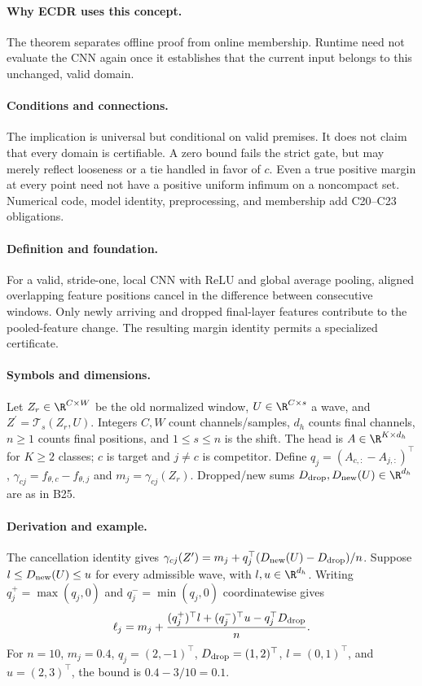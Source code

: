 \paragraph{Why ECDR uses this concept.}
The theorem separates offline proof from online membership. Runtime need not evaluate the CNN again once it establishes that the current input belongs to this unchanged, valid domain.
\paragraph{Conditions and connections.}
The implication is universal but conditional on valid premises. It does not claim that every domain is certifiable. A zero bound fails the strict gate, but may merely reflect looseness or a tie handled in favor of $c$. Even a true positive margin at every point need not have a positive uniform infimum on a noncompact set. Numerical code, model identity, preprocessing, and membership add C20--C23 obligations.

\paragraph{Definition and foundation.}
For a valid, stride-one, local CNN with ReLU and global average pooling, aligned overlapping feature positions cancel in the difference between consecutive windows. Only newly arriving and dropped final-layer features contribute to the pooled-feature change. The resulting margin identity permits a specialized certificate.
\paragraph{Symbols and dimensions.}
Let $Z_r\in\R^{C\times W}$ be the old normalized window, $U\in\R^{C\times s}$ a wave, and $Z^\prime=\mathcal T_s(Z_r,U)$. Integers $C,W$ count channels/samples, $d_h$ counts final channels, $n\ge1$ counts final positions, and $1\le s\le n$ is the shift. The head is $A\in\R^{K\times d_h}$ for $K\ge2$ classes; $c$ is target and $j\ne c$ is competitor. Define $q_j=(A_{c,:}-A_{j,:})^\top$, $\gamma_{cj}=f_{\theta,c}-f_{\theta,j}$ and $m_j=\gamma_{cj}(Z_r)$. Dropped/new sums $D_{\rm drop},D_{\rm new}(U)\in\R^{d_h}$ are as in B25.
\paragraph{Derivation and example.}
The cancellation identity gives $\gamma_{cj}(Z^\prime)=m_j+q_j^\top(D_{\rm new}(U)-D_{\rm drop})/n$. Suppose $l\le D_{\rm new}(U)\le u$ for every admissible wave, with $l,u\in\R^{d_h}$. Writing $q_j^+=\max(q_j,0)$ and $q_j^-=\min(q_j,0)$ coordinatewise gives
\[
 \ell_j=m_j+\frac{(q_j^+)^\top l+(q_j^-)^\top u
                   -q_j^\top D_{\rm drop}}{n}.
\]
For $n=10$, $m_j=0.4$, $q_j=(2,-1)^\top$, $D_{\rm drop}=(1,2)^\top$, $l=(0,1)^\top$, and $u=(2,3)^\top$, the bound is $0.4-3/10=0.1$.
